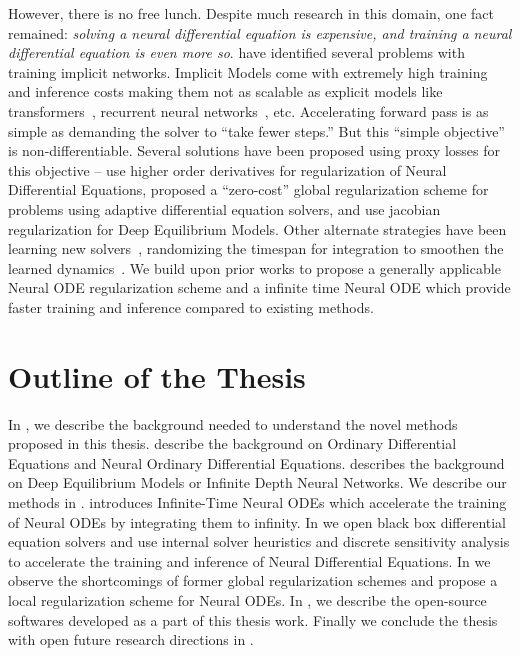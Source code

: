 However, there is no free lunch. Despite much research in this domain, one fact remained: \textit{solving a neural differential equation is expensive, and training a neural differential equation is even more so}. \citet{grathwohl2018ffjord, dupont2019augmented, kelly2020learning, finlay2020train} have identified several problems with training implicit networks. Implicit Models come with extremely high training and inference costs making them not as scalable as explicit models like transformers~\citep{chen2016attention, vaswani2017attention}, recurrent neural networks~\citep{elman1990finding, hochreiter1997long}, etc. Accelerating forward pass is as simple as demanding the solver to ``take fewer steps.'' But this ``simple objective'' is non-differentiable. Several solutions have been proposed using proxy losses for this objective -- \citet{kelly2020learning, finlay2020train} use higher order derivatives for regularization of Neural Differential Equations, \citet{pal2021opening} proposed a ``zero-cost'' global regularization scheme for problems using adaptive differential equation solvers, and \citet{bai2021stabilizing} use jacobian regularization for Deep Equilibrium Models. Other alternate strategies have been learning new solvers~\citep{poli2020hypersolvers}, randomizing the timespan for integration to smoothen the learned dynamics~\citep{ghosh2020steer}. We build upon prior works to  propose a generally applicable Neural ODE regularization scheme and a infinite time Neural ODE which provide faster training and inference compared to existing methods.

\section{Outline of the Thesis}

In , we describe the background needed to understand the novel methods proposed in this thesis.  describe the background on Ordinary Differential Equations and Neural Ordinary Differential Equations.  describes the background on Deep Equilibrium Models or Infinite Depth Neural Networks. We describe our methods in .  introduces Infinite-Time Neural ODEs which accelerate the training of Neural ODEs by integrating them to infinity. In  we open black box differential equation solvers and use internal solver heuristics and discrete sensitivity analysis to accelerate the training and inference of Neural Differential Equations. In  we observe the shortcomings of former global regularization schemes and propose a local regularization scheme for Neural ODEs. In , we describe the open-source softwares developed as a part of this thesis work. Finally we conclude the thesis with open future research directions in .

